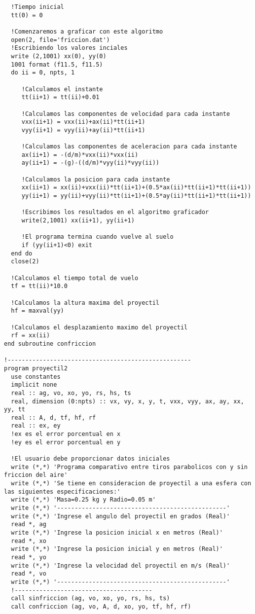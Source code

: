 \documentclass[a4paper]{article}
\begin{document}
\begin{verbatim}
  !Tiempo inicial
  tt(0) = 0

  !Comenzaremos a graficar con este algoritmo   
  open(2, file='friccion.dat')   
  !Escribiendo los valores inciales
  write (2,1001) xx(0), yy(0)
  1001 format (f11.5, f11.5)
  do ii = 0, npts, 1
     
     !Calculamos el instante
     tt(ii+1) = tt(ii)+0.01 
    
     !Calculamos las componentes de velocidad para cada instante 
     vxx(ii+1) = vxx(ii)+ax(ii)*tt(ii+1)   
     vyy(ii+1) = vyy(ii)+ay(ii)*tt(ii+1)  

     !Calculamos las componentes de aceleracion para cada instante
     ax(ii+1) = -(d/m)*vxx(ii)*vxx(ii)
     ay(ii+1) = -(g)-((d/m)*vyy(ii)*vyy(ii))

     !Calculamos la posicion para cada instante
     xx(ii+1) = xx(ii)+vxx(ii)*tt(ii+1)+(0.5*ax(ii)*tt(ii+1)*tt(ii+1))
     yy(ii+1) = yy(ii)+vyy(ii)*tt(ii+1)+(0.5*ay(ii)*tt(ii+1)*tt(ii+1))
     
     !Escribimos los resultados en el algoritmo graficador   
     write(2,1001) xx(ii+1), yy(ii+1)  

     !El programa termina cuando vuelve al suelo   
     if (yy(ii+1)<0) exit   
  end do
  close(2)

  !Calculamos el tiempo total de vuelo
  tf = tt(ii)*10.0

  !Calculamos la altura maxima del proyectil
  hf = maxval(yy)

  !Calculamos el desplazamiento maximo del proyectil
  rf = xx(ii)
end subroutine confriccion

!----------------------------------------------------     
program proyectil2
  use constantes
  implicit none
  real :: ag, vo, xo, yo, rs, hs, ts
  real, dimension (0:npts) :: vx, vy, x, y, t, vxx, vyy, ax, ay, xx, yy, tt
  real :: A, d, tf, hf, rf
  real :: ex, ey
  !ex es el error porcentual en x
  !ey es el error porcentual en y

  !El usuario debe proporcionar datos iniciales
  write (*,*) 'Programa comparativo entre tiros parabolicos con y sin friccion del aire'
  write (*,*) 'Se tiene en consideracion de proyectil a una esfera con las siguientes especificaciones:'
  write (*,*) 'Masa=0.25 kg y Radio=0.05 m'  
  write (*,*) '------------------------------------------------'  
  write (*,*) 'Ingrese el angulo del proyectil en grados (Real)'   
  read *, ag   
  write (*,*) 'Ingrese la posicion inicial x en metros (Real)'   
  read *, xo
  write (*,*) 'Ingrese la posicion inicial y en metros (Real)'   
  read *, yo
  write (*,*) 'Ingrese la velocidad del proyectil en m/s (Real)'   
  read *, vo  
  write (*,*) '------------------------------------------------'   
  !---------------------------------------
  call sinfriccion (ag, vo, xo, yo, rs, hs, ts)
  call confriccion (ag, vo, A, d, xo, yo, tf, hf, rf)


\end{verbatim}
\end{document}
